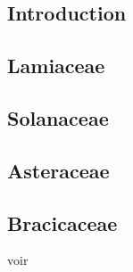 \subsection{Introduction}


\subsection{Lamiaceae}


\subsection{Solanaceae}


\subsection{Asteraceae}


\subsection{Bracicaceae}


voir \cite{laporte2023}